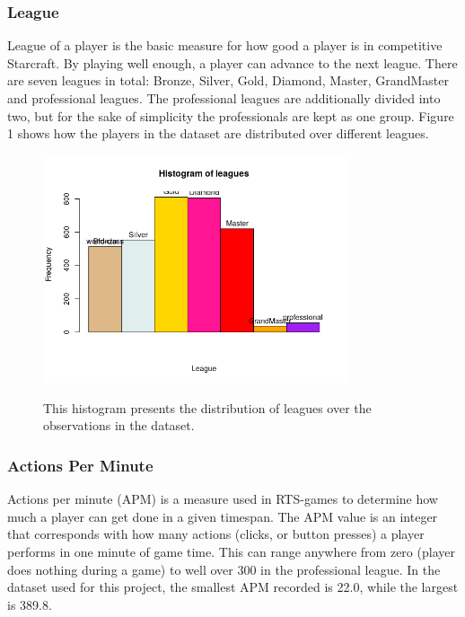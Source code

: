 \documentclass{article}
\begin{document}
\subsubsection{League}
League of a player is the basic measure for how good a player is in competitive Starcraft. By playing well enough, a player can advance to the next league. There are seven leagues in total: Bronze, Silver, Gold, Diamond, Master, GrandMaster and professional leagues. The professional leagues are additionally divided into two, but for the sake of simplicity the professionals are kept as one group. Figure 1 shows how the players in the dataset are distributed over different leagues.

\begin{figure} [H]
    \centering
    \includegraphics[width= 0.8\textwidth]{league_hist.png}
    \label{figure:league-hist}
    \caption{This histogram presents the distribution of leagues over the observations in the dataset.}
\end{figure}

\subsubsection{Actions Per Minute}
Actions per minute (APM) is a measure used in RTS-games to determine how much a player can get done in a given timespan. The APM value is an integer that corresponds with how many actions (clicks, or button presses) a player performs in one minute of game time. This can range anywhere from zero (player does nothing during a game) to well over 300 in the professional league. In the dataset used for this project, the smallest APM recorded is 22.0, while the largest is 389.8.
\end{document}
